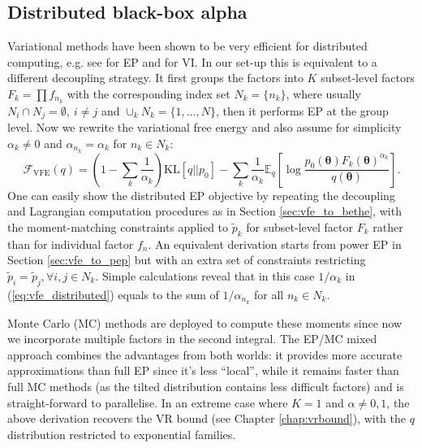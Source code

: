 \subsection{Distributed black-box alpha}
Variational methods have been shown to be very efficient for distributed computing, e.g. see \citet{gelman:dep2014, xu:sms2014, teh:snep2015} for EP and \citet{broderick:stream2013} for VI. In our set-up this is equivalent to a different decoupling strategy. It first groups the factors into $K$ subset-level factors $F_k = \prod f_{n_k}$ with the corresponding index set $N_k = \{n_k\}$, where usually $N_i \cap N_j = \emptyset,\ i \neq j$ and $\cup_k N_k = \{1, ..., N\}$, then it performs EP at the group level. Now we rewrite the variational free energy and also assume for simplicity $\alpha_k \neq 0$ and $\alpha_{n_k} = \alpha_k$ for $n_k \in N_k$:
\begin{equation}
\mathcal{F}_{\text{VFE}}(q) = \left(1 - \sum_{k} \frac{1}{\alpha_k} \right) \mathrm{KL}[q||p_0] - \sum_k \frac{1}{\alpha_k} \mathbb{E}_{q} \left[ \log \frac{p_0(\bm{\theta}) F_k(\bm{\theta})^{\alpha_k}}{q(\bm{\theta})} \right].
\label{eq:vfe_distributed}
\end{equation}
%
One can easily show the distributed EP objective by repeating the decoupling and Lagrangian computation procedures as in Section \ref{sec:vfe_to_bethe}, with the moment-matching constraints applied to $\tilde{p}_k$ for subset-level factor $F_k$ rather than for individual factor $f_n$. An equivalent derivation starts from power EP in Section \ref{sec:vfe_to_pep} but with an extra set of constraints restricting $\tilde{p}_i = \tilde{p}_j, \forall i, j \in N_k$. Simple calculations reveal that in this case $1/\alpha_k$ in (\ref{eq:vfe_distributed}) equals to the sum of $1/\alpha_{n_k}$ for all $n_k \in N_k$.

Monte Carlo (MC) methods are deployed to compute these moments since now we incorporate multiple factors in the second integral. The EP/MC mixed approach combines the advantages from both worlds: it provides more accurate approximations than full EP since it's less ``local'', while it remains faster than full MC methods (as the tilted distribution contains less difficult factors) and is straight-forward to parallelise. In an extreme case where $K=1$ and $\alpha \neq 0, 1$, the above derivation recovers the VR bound (see Chapter \ref{chap:vrbound}), with the $q$ distribution restricted to exponential families. 

